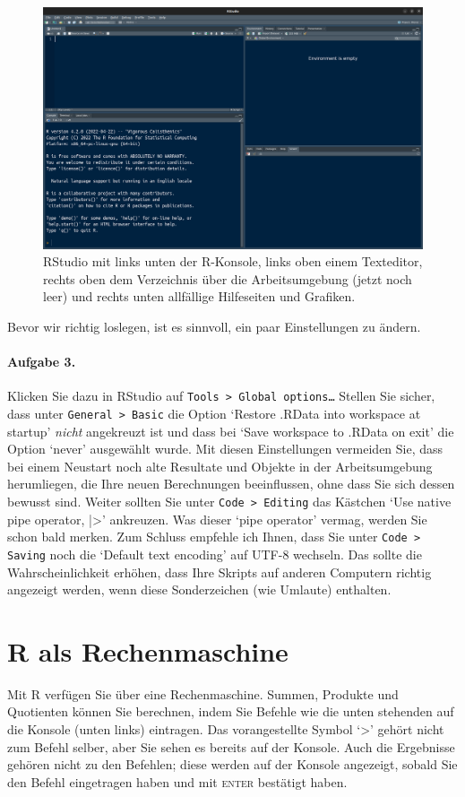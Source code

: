 \documentclass[oneside, 10pt]{book}\usepackage[]{graphicx}\usepackage[]{xcolor}
\begin{document}
\begin{figure}[ht]
 \includegraphics[max width = \textwidth]{figs/RStudio.png}
 \caption{RStudio mit links unten der R-Konsole, links oben einem Texteditor, rechts oben dem Verzeichnis über die Arbeitsumgebung (jetzt noch leer) und rechts unten allfällige Hilfeseiten und Grafiken.}
 \label{fig:rstudio}
\end{figure}

Bevor wir richtig loslegen, ist es sinnvoll, ein paar Einstellungen zu ändern.

\paragraph{Aufgabe 3.}
Klicken Sie dazu in RStudio auf \texttt{Tools > Global options\dots}
Stellen Sie sicher, dass unter \texttt{General > Basic} die Option
`Restore .RData into workspace at startup' \emph{nicht} angekreuzt ist
und dass bei `Save workspace to .RData on exit' die Option `never'
ausgewählt wurde.
Mit diesen Einstellungen vermeiden Sie, dass bei einem Neustart noch
alte Resultate und Objekte in der Arbeitsumgebung herumliegen,
die Ihre neuen Berechnungen beeinflussen, ohne dass Sie sich dessen
bewusst sind.
Weiter sollten Sie unter \texttt{Code > Editing} das Kästchen
`Use native pipe operator, |>' ankreuzen.
Was dieser `pipe operator' vermag, werden Sie schon bald merken.
Zum Schluss empfehle ich Ihnen, dass Sie unter \texttt{Code > Saving}
noch die `Default text encoding' auf UTF-8 wechseln. Das sollte
die Wahrscheinlichkeit erhöhen, dass Ihre Skripts auf anderen
Computern richtig angezeigt werden, wenn diese Sonderzeichen (wie Umlaute)
enthalten.

\section{R als Rechenmaschine}\label{sec:calculator}
Mit R verfügen Sie über eine Rechenmaschine.
Summen, Produkte und Quotienten können Sie
berechnen, indem Sie Befehle wie die unten stehenden
auf die Konsole (unten links) eintragen.
Das vorangestellte Symbol `>' gehört nicht zum Befehl selber,
aber Sie sehen es bereits auf der Konsole.
Auch die Ergebnisse gehören nicht zu
den Befehlen; diese werden auf der Konsole
angezeigt, sobald Sie den Befehl eingetragen
haben und mit \textsc{enter} bestätigt haben.
\end{document}
